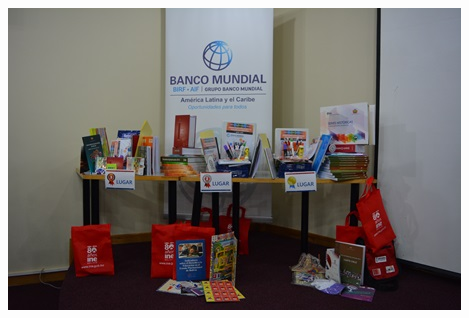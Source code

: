 \documentclass[8pt,a4paper]{article} %
\begin{document}
\begin{multicols}{2}
\begin{center}
\includegraphics[scale=0.6]{foto5.jpg} %
\end{center}

\vspace{10cm}

\end{multicols} %
\end{document}

